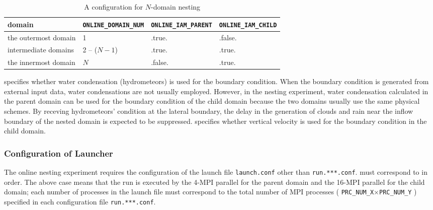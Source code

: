 \begin{table}[htb]
\begin{center}
\caption{A configuration for $N$-domain nesting}
\begin{tabularx}{150mm}{|l|l|l|X|} \hline
 \rowcolor[gray]{0.9} domain & \verb|ONLINE_DOMAIN_NUM| & \verb|ONLINE_IAM_PARENT| & \verb|ONLINE_IAM_CHILD|\\ \hline
 the outermost domain & 1            & .true.  & .false. \\ \hline
 intermediate domains & 2 -- ($N-1$) & .true.  & .true. \\ \hline
 the innermost domain & $N$          & .false. & .true. \\ \hline
\end{tabularx}
\label{tab:triple_nested}
\end{center}
\end{table}


 specifies whether water condensation (hydrometeors) is used for the boundary condition.
When the boundary condition is generated from external input data, water condensations are not usually employed.
However, in the \scalerm nesting experiment, water condensation calculated in the parent domain can be used for the boundary condition of the child domain because the two domains usually use the same physical schemes.
By receving hydrometeors' condition at the lateral boundary,
the delay in the generation of clouds and rain near the inflow boundary of the nested domain is expected to be suppressed.
 specifies whether vertical velocity is used for the boundary condition in the child domain.

\subsubsection{Configuration of Launcher}
\label{subsubsec:launch}
The online nesting experiment requires the configuration of the launch file \verb|launch.conf|
other than \verb|run.***.conf|.
 must correspond to  in order.
The above case means that
the run is executed by
the 4-MPI parallel for the parent domain 
and the 16-MPI parallel for the child domain;
each number of processes in the launch file 
must correspond to the total number of MPI processes ( \verb|PRC_NUM_X|$\times$\verb|PRC_NUM_Y| )
specified in each configuration file \verb|run.***.conf|.

